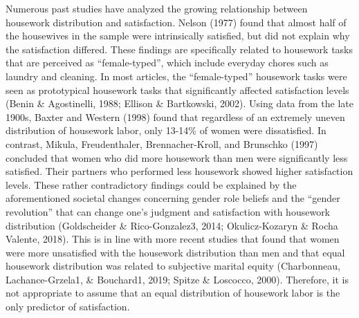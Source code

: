 \documentclass[
  man,floatsintext]{apa6}
\begin{document}
Numerous past studies have analyzed the growing relationship between housework distribution and satisfaction. Nelson (1977) found that almost half of the housewives in the sample were intrinsically satisfied, but did not explain why the satisfaction differed. These findings are specifically related to housework tasks that are perceived as ``female-typed'', which include everyday chores such as laundry and cleaning. In most articles, the ``female-typed'' housework tasks were seen as prototypical housework tasks that significantly affected satisfaction levels (Benin \& Agostinelli, 1988; Ellison \& Bartkowski, 2002). Using data from the late 1900s, Baxter and Western (1998) found that regardless of an extremely uneven distribution of housework labor, only 13-14\% of women were dissatisfied. In contrast, Mikula, Freudenthaler, Brennacher-Kroll, and Brunschko (1997) concluded that women who did more housework than men were significantly less satisfied. Their partners who performed less housework showed higher satisfaction levels.
These rather contradictory findings could be explained by the aforementioned societal changes concerning gender role beliefs and the ``gender revolution'' that can change one's judgment and satisfaction with housework distribution (Goldscheider \& Rico-Gonzalez3, 2014; Okulicz-Kozaryn \& Rocha Valente, 2018). This is in line with more recent studies that found that women were more unsatisfied with the housework distribution than men and that equal housework distribution was related to subjective marital equity (Charbonneau, Lachance-Grzela1, \& Bouchard1, 2019; Spitze \& Loscocco, 2000). Therefore, it is not appropriate to assume that an equal distribution of housework labor is the only predictor of satisfaction.
\end{document}
